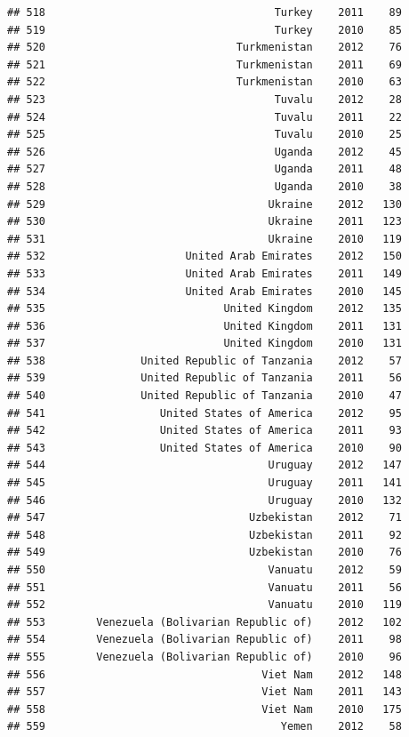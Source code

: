 \documentclass[
]{book}
\begin{document}
\begin{verbatim}
## 518                                    Turkey    2011    89
## 519                                    Turkey    2010    85
## 520                              Turkmenistan    2012    76
## 521                              Turkmenistan    2011    69
## 522                              Turkmenistan    2010    63
## 523                                    Tuvalu    2012    28
## 524                                    Tuvalu    2011    22
## 525                                    Tuvalu    2010    25
## 526                                    Uganda    2012    45
## 527                                    Uganda    2011    48
## 528                                    Uganda    2010    38
## 529                                   Ukraine    2012   130
## 530                                   Ukraine    2011   123
## 531                                   Ukraine    2010   119
## 532                      United Arab Emirates    2012   150
## 533                      United Arab Emirates    2011   149
## 534                      United Arab Emirates    2010   145
## 535                            United Kingdom    2012   135
## 536                            United Kingdom    2011   131
## 537                            United Kingdom    2010   131
## 538               United Republic of Tanzania    2012    57
## 539               United Republic of Tanzania    2011    56
## 540               United Republic of Tanzania    2010    47
## 541                  United States of America    2012    95
## 542                  United States of America    2011    93
## 543                  United States of America    2010    90
## 544                                   Uruguay    2012   147
## 545                                   Uruguay    2011   141
## 546                                   Uruguay    2010   132
## 547                                Uzbekistan    2012    71
## 548                                Uzbekistan    2011    92
## 549                                Uzbekistan    2010    76
## 550                                   Vanuatu    2012    59
## 551                                   Vanuatu    2011    56
## 552                                   Vanuatu    2010   119
## 553        Venezuela (Bolivarian Republic of)    2012   102
## 554        Venezuela (Bolivarian Republic of)    2011    98
## 555        Venezuela (Bolivarian Republic of)    2010    96
## 556                                  Viet Nam    2012   148
## 557                                  Viet Nam    2011   143
## 558                                  Viet Nam    2010   175
## 559                                     Yemen    2012    58

\end{verbatim}
\end{document}
